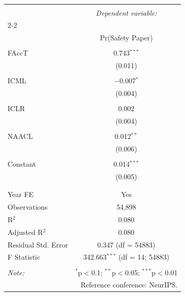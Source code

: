 
\begin{table}[!htbp] \centering 
  \caption{} 
  \label{} 
\begin{tabular}{@{\extracolsep{5pt}}lc} 
\\[-1.8ex]\hline 
\hline \\[-1.8ex] 
 & \multicolumn{1}{c}{\textit{Dependent variable:}} \\ 
\cline{2-2} 
\\[-1.8ex] & Pr(Safety Paper) \\ 
\hline \\[-1.8ex] 
 FAccT & 0.743$^{***}$ \\ 
  & (0.011) \\ 
  & \\ 
 ICML & $-$0.007$^{*}$ \\ 
  & (0.004) \\ 
  & \\ 
 ICLR & 0.002 \\ 
  & (0.004) \\ 
  & \\ 
 NAACL & 0.012$^{**}$ \\ 
  & (0.006) \\ 
  & \\ 
 Constant & 0.014$^{***}$ \\ 
  & (0.005) \\ 
  & \\ 
\hline \\[-1.8ex] 
Year FE & Yes \\ 
Observations & 54,898 \\ 
R$^{2}$ & 0.080 \\ 
Adjusted R$^{2}$ & 0.080 \\ 
Residual Std. Error & 0.347 (df = 54883) \\ 
F Statistic & 342.663$^{***}$ (df = 14; 54883) \\ 
\hline 
\hline \\[-1.8ex] 
\textit{Note:}  & \multicolumn{1}{r}{$^{*}$p$<$0.1; $^{**}$p$<$0.05; $^{***}$p$<$0.01} \\ 
 & \multicolumn{1}{r}{Reference conference: NeurIPS.} \\ 
\end{tabular} 
\end{table} 

